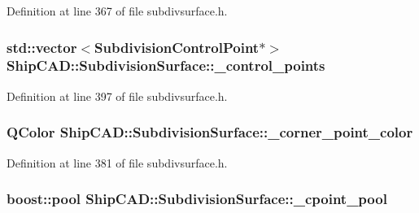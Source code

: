 Definition at line 367 of file subdivsurface.\-h.

\hypertarget{classShipCAD_1_1SubdivisionSurface_a906d5981dc482ede1bb3c7256e750945}{
\subsubsection[{\-\_\-control\-\_\-points}]{\setlength{\rightskip}{0pt plus 5cm}std\-::vector$<${\bf Subdivision\-Control\-Point}$\ast$$>$ Ship\-C\-A\-D\-::\-Subdivision\-Surface\-::\-\_\-control\-\_\-points\hspace{0.3cm}{\ttfamily [protected]}}}\label{classShipCAD_1_1SubdivisionSurface_a906d5981dc482ede1bb3c7256e750945}


Definition at line 397 of file subdivsurface.\-h.

\hypertarget{classShipCAD_1_1SubdivisionSurface_aba9fae36ed19b802707c748396c1fd63}{
\subsubsection[{\-\_\-corner\-\_\-point\-\_\-color}]{\setlength{\rightskip}{0pt plus 5cm}Q\-Color Ship\-C\-A\-D\-::\-Subdivision\-Surface\-::\-\_\-corner\-\_\-point\-\_\-color\hspace{0.3cm}{\ttfamily [protected]}}}\label{classShipCAD_1_1SubdivisionSurface_aba9fae36ed19b802707c748396c1fd63}


Definition at line 381 of file subdivsurface.\-h.

\hypertarget{classShipCAD_1_1SubdivisionSurface_abd895a11906e0d5b5f8f4a5fc090b428}{
\subsubsection[{\-\_\-cpoint\-\_\-pool}]{\setlength{\rightskip}{0pt plus 5cm}boost\-::pool Ship\-C\-A\-D\-::\-Subdivision\-Surface\-::\-\_\-cpoint\-\_\-pool\hspace{0.3cm}{\ttfamily [protected]}}}\label{classShipCAD_1_1SubdivisionSurface_abd895a11906e0d5b5f8f4a5fc090b428}


